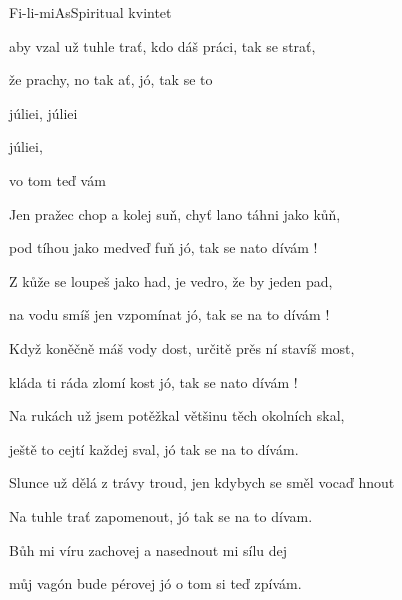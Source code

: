 \begin{song}{Fi-li-mi}{As}{Spiritual kvintet}
\begin{SBVerse}
 aby vzal už tuhle trať, kdo dáš práci, tak se strať,

že  prachy, no tak ať, jó, tak se to 


\end{SBVerse}
\begin{SBChorus}
 júliei,  júliei

 júliei,

vo tom teď vám
\end{SBChorus}
\begin{SBVerse}
Jen pražec chop a kolej suň, chyť lano táhni jako kůň, 

pod tíhou jako medveď fuň jó, tak se nato dívám !
\end{SBVerse}
\begin{SBVerse}
Z kůže se loupeš jako had, je vedro, že by jeden pad, 

na vodu smíš jen vzpomínat jó, tak se na to dívám !
\end{SBVerse}
\begin{SBVerse}
Když koněčně máš vody dost, určitě prěs ní stavíš most, 

kláda ti ráda zlomí kost jó, tak se nato dívám ! 

\end{SBVerse}
\begin{SBVerse}
Na rukách už jsem potěžkal většinu těch okolních skal, 

ještě to cejtí každej sval, jó tak se na to dívám.

\end{SBVerse}
\begin{SBVerse}
Slunce už dělá z trávy troud, jen kdybych se směl vocaď hnout

Na tuhle trať zapomenout, jó tak se na to dívam.
\end{SBVerse}
\begin{SBVerse}
Bůh mi víru zachovej a nasednout mi sílu dej

můj vagón bude pérovej jó o tom si teď zpívám.
\end{SBVerse}
\end{song}

